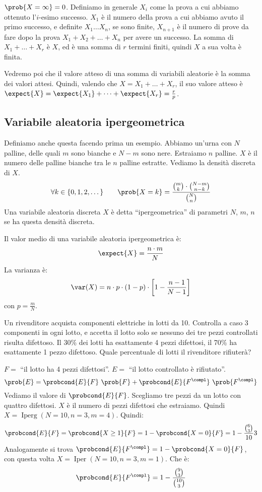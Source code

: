 
$\prob{X = \infty} = 0$. Definiamo in generale $X_i$ come la prova a cui abbiamo ottenuto l'$i$-esimo successo. $X_1$ \`e il numero della prova a cui abbiamo avuto il primo successo, e definite $X_1 \dots X_n$, se sono finite, $X_{n +1}$ \`e il numero di prove da fare dopo la prova $X_1 + X_2 + \dots + X_n$ per avere un successo. La somma di $X_1 + \dots + X_r$ \`e $X$, ed \`e una somma di $r$ termini finiti, quindi $X$ a sua volta \`e finita.

Vedremo poi che il valore atteso di una somma di variabili aleatorie \`e la somma dei valori attesi. Quindi, valendo che $X = X_1 + \dots + X_r$, il suo valore atteso \`e $\expect{X} = \expect{X_1} + \dots + \expect{X_r} = \frac{r}{p}$.

\subsection{Variabile aleatoria ipergeometrica}

\begin{defn}
Definiamo anche questa facendo prima un esempio. Abbiamo un'urna con $N$ palline, delle quali $m$ sono bianche e $N - m$ sono nere. Estraiamo $n$ palline. $X$ \`e il numero delle palline bianche tra le $n$ palline estratte. Vediamo la densit\`a discreta di $X$.
\[
\forall k \in \{ 0, 1, 2, \dots \} \qquad \prob{X = k} = \frac{\binom{m}{k} \cdot \binom{N - m}{n - k}}{\binom{N}{n}}
\]
Una variabile aleatoria discreta $X$ \`e detta ``ipergeometrica'' di parametri $N$, $m$, $n$ se ha questa densit\`a discreta.

Il valor medio di una variabile aleatoria ipergeometrica \`e:
\[
\expect{X} = \frac{n \cdot m}{N}
\]
La varianza \`e:
\[
\var (X) = n \cdot p \cdot (1 - p) \cdot \left[ 1 - \frac{n - 1}{N - 1} \right]
\]
con $p = \frac{m}{N}$.
\end{defn}
\begin{exmp}
Un rivenditore acquista componenti elettriche in lotti da 10. Controlla a caso 3 componenti in ogni lotto, e accetta il lotto solo se nessuno dei tre pezzi controllati risulta difettoso. Il 30\% dei lotti ha esattamente 4 pezzi difettosi, il 70\% ha esattamente 1 pezzo difettoso. Quale percentuale di lotti il rivenditore rifiuter\`a?

$F = $ ``il lotto ha 4 pezzi difettosi''. $E = $ ``il lotto controllato \`e rifiutato''.
\[
\prob{E} = \probcond{E}{F} \ \prob{F} + \probcond{E}{F^{\compl}} \ \prob{F^{\compl}}
\]
Vediamo il valore di $\probcond{E}{F}$. Scegliamo tre pezzi da un lotto con quattro difettosi. $X$ \`e il numero di pezzi difettosi che estraiamo. Quindi $X = \operatorname{Iperg}(N = 10, n = 3, m = 4)$. Quindi:
\[
\probcond{E}{F} = \probcond{X \ge 1}{F} = 1 - \probcond{X = 0}{F} =
1 - \frac{\binom{6}{3}}{10}{3}
\]
Analogamente si trova $\probcond{E}{F^{\compl}} = 1 - \probcond{X =0}{F}$, con questa volta $X = \operatorname{Iper}(N = 10, n = 3, m = 1)$. Che \`e:
\[
\probcond{E}{F^{\compl}} = 1 - \frac{\binom{9}{3}}{\binom{10}{3}}
\]
\end{exmp}

